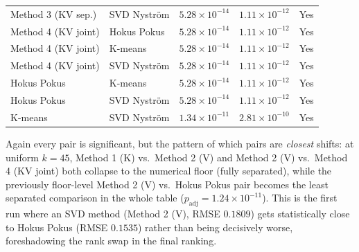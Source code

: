 \begin{table}[H]
\begin{tabular}{ll cc c}
Method 3 (KV sep.) & SVD Nyström         & $5.28 \times 10^{-14}$ & $1.11 \times 10^{-12}$ & Yes \\
\addlinespace
Method 4 (KV joint) & Hokus Pokus        & $5.28 \times 10^{-14}$ & $1.11 \times 10^{-12}$ & Yes \\
Method 4 (KV joint) & K-means            & $5.28 \times 10^{-14}$ & $1.11 \times 10^{-12}$ & Yes \\
Method 4 (KV joint) & SVD Nyström        & $5.28 \times 10^{-14}$ & $1.11 \times 10^{-12}$ & Yes \\
\addlinespace
Hokus Pokus        & K-means             & $5.28 \times 10^{-14}$ & $1.11 \times 10^{-12}$ & Yes \\
Hokus Pokus        & SVD Nyström         & $5.28 \times 10^{-14}$ & $1.11 \times 10^{-12}$ & Yes \\
\addlinespace
K-means            & SVD Nyström         & $1.34 \times 10^{-11}$ & $2.81 \times 10^{-10}$ & Yes \\
\bottomrule
\end{tabular}
\end{table}

\noindent Again every pair is significant, but the pattern of which pairs are \emph{closest}
shifts: at uniform $k=45$, Method 1 (K) vs.\ Method 2 (V) and Method 2 (V) vs.\ Method 4 (KV joint)
both collapse to the numerical floor (fully separated), while the previously floor-level Method 2
(V) vs.\ Hokus Pokus pair becomes the least separated comparison in the whole table
($p_\text{adj} = 1.24\times10^{-11}$). This is the first run where an SVD method (Method 2 (V),
RMSE $0.1809$) gets statistically close to Hokus Pokus (RMSE $0.1535$) rather than being
decisively worse, foreshadowing the rank swap in the final ranking.


